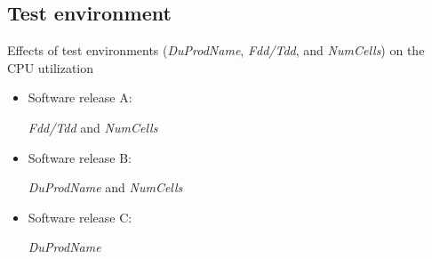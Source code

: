 \documentclass{beamer}
\begin{document}
\subsection{Test environment}
\begin{frame}[fragile]
Effects of test environments (\textit{DuProdName}, \textit{Fdd/Tdd}, and \textit{NumCells}) on the CPU utilization

\begin{itemize}
\item Software release A:

\textit{Fdd/Tdd} and \textit{NumCells}

\item Software release B:

\textit{DuProdName} and \textit{NumCells}

\item Software release C:

\textit{DuProdName} 

\end{itemize}

\end{frame}
\end{document}

